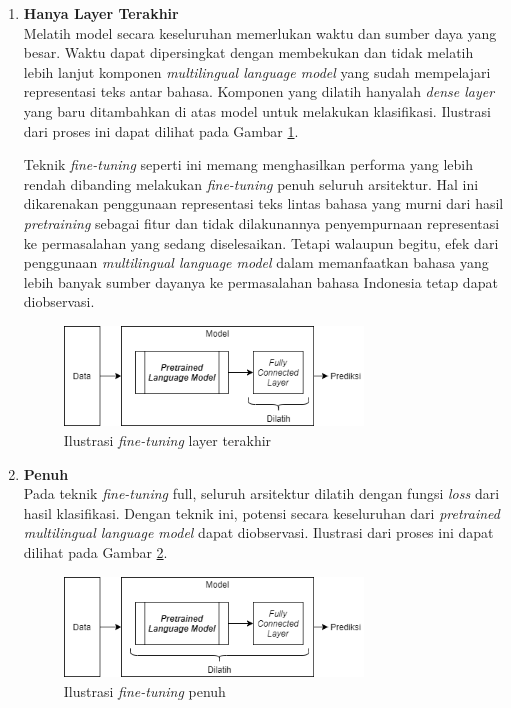 	\begin{enumerate}
		\item \textbf{Hanya Layer Terakhir}\\	
		Melatih	model secara keseluruhan memerlukan waktu dan sumber daya yang besar. Waktu dapat dipersingkat dengan membekukan dan tidak melatih lebih lanjut komponen \textit{multilingual language model} yang sudah mempelajari representasi teks antar bahasa. Komponen yang dilatih hanyalah \textit{dense layer} yang baru ditambahkan di atas model untuk melakukan klasifikasi. Ilustrasi dari proses ini dapat dilihat pada Gambar \ref{fig:ilustrasi_head_fine_tune}.

        Teknik \textit{fine-tuning} seperti ini memang menghasilkan performa yang lebih rendah dibanding melakukan \textit{fine-tuning} penuh seluruh arsitektur. Hal ini dikarenakan penggunaan representasi teks lintas bahasa yang murni dari hasil \textit{pretraining} sebagai fitur dan tidak dilakunannya penyempurnaan representasi ke permasalahan yang sedang diselesaikan. Tetapi walaupun begitu, efek dari penggunaan \textit{multilingual language model} dalam memanfaatkan bahasa yang lebih banyak sumber dayanya ke permasalahan bahasa Indonesia tetap dapat diobservasi.
        
        \begin{figure}[h]
            \centering
            \includegraphics[width=0.75\textwidth]{resources/Head-fine-tune.png}
            \caption{ Ilustrasi \textit{fine-tuning} layer terakhir}
            \label{fig:ilustrasi_head_fine_tune}
        \end{figure}

		\item \textbf{Penuh}\\
        Pada teknik \textit{fine-tuning} full, seluruh arsitektur dilatih dengan fungsi \textit{loss} dari hasil klasifikasi. Dengan teknik ini, potensi secara keseluruhan dari \textit{pretrained multilingual language model} dapat diobservasi. Ilustrasi dari proses ini dapat dilihat pada Gambar \ref{fig:ilustrasi_full_fine_tune}.
        
        \begin{figure}[h]
            \centering
            \includegraphics[width=0.75\textwidth]{resources/Full-fine-tune.png}
            \caption{ Ilustrasi \textit{fine-tuning} penuh}
            \label{fig:ilustrasi_full_fine_tune}
        \end{figure}
		
	\end{enumerate}

